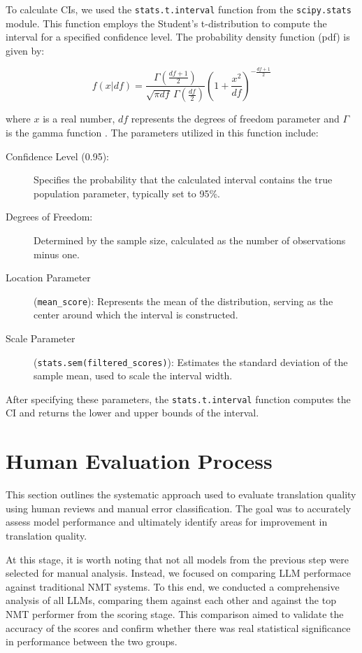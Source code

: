 To calculate CIs, we used the \texttt{stats.t.interval} function from the \texttt{scipy.stats} module. This function employs the Student’s t-distribution to compute the interval for a specified confidence level. The probability density function (pdf) is given by:

\begin{equation} \label{formula: t-dis}
f(x|df) = \frac{\Gamma\left(\frac{df+1}{2}\right)}{\sqrt{\pi df} \, \Gamma\left(\frac{df}{2}\right)} \left(1 + \frac{x^2}{df} \right)^{-\frac{df+1}{2}}
\end{equation} 

where $x$ is a real number, $df$ represents the degrees of freedom parameter and $\Gamma$ is the gamma function \parencite{scipy_stats_t}. The parameters utilized in this function include:

\begin{description}
    \item[Confidence Level (0.95):] Specifies the probability that the calculated interval contains the true population parameter, typically set to 95\%.
    \item[Degrees of Freedom:] Determined by the sample size, calculated as the number of observations minus one.
    \item[Location Parameter] (\texttt{mean\_score}): Represents the mean of the distribution, serving as the center around which the interval is constructed.
    \item[Scale Parameter] (\texttt{stats.sem(filtered\_scores)}): Estimates the standard deviation of the sample mean, used to scale the interval width.
\end{description}


After specifying these parameters, the \texttt{stats.t.interval} function computes the CI and returns the lower and upper bounds of the interval.

\section{Human Evaluation Process}
\label{sec: Human Evaluation}

This section outlines the systematic approach used to evaluate translation quality using human reviews and manual error classification. The goal was to accurately assess model performance and ultimately identify areas for improvement in translation quality.

At this stage, it is worth noting that not all models from the previous step were selected for manual analysis. Instead, we focused on comparing LLM performace against traditional NMT systems. To this end, we conducted a comprehensive analysis of all LLMs, comparing them against each other and against the top NMT performer from the scoring stage. This comparison aimed to validate the accuracy of the scores and confirm whether there was real statistical significance in performance between the two groups.

